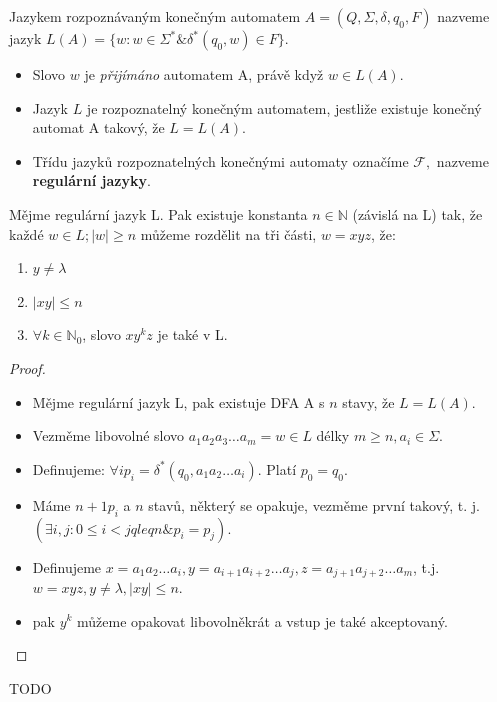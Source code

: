\documentclass[../main.tex]{subfiles}
\begin{document}
\begin{definition}
    Jazykem rozpoznávaným konečným automatem $A = (Q, \Sigma, \delta, q_0, F)$ nazveme jazyk
    $L(A) = \{ w : w \in \Sigma^* \& \delta^* (q_0,w) \in F\}$.

    \begin{itemize}
        \item Slovo $w$ je \textit{přijímáno} automatem A, právě když $w \in L(A)$.
        \item Jazyk $L$ je rozpoznatelný konečným automatem, jestliže existuje konečný automat A takový, že $L = L(A)$.
        \item Třídu jazyků rozpoznatelných konečnými automaty označíme $\mathcal{F},$ nazveme \textbf{regulární jazyky}.
    \end{itemize}
\end{definition}

\begin{theorem}
    Mějme regulární jazyk L. Pak existuje konstanta $n \in \mathbb{N}$ (závislá na L) tak, že 
    každé $w \in L; |w| \geq n$ můžeme rozdělit na tři části, $w = xyz$, že:
    \begin{enumerate}
        \item $y \neq \lambda$
        \item $|xy| \leq n$
        \item $\forall k \in \mathbb{N}_0$, slovo $xy^kz$ je také v L.
    \end{enumerate}

    \begin{proof}
        \begin{itemize}
            \item Mějme regulární jazyk L, pak existuje DFA A s $n$ stavy, že $L = L(A)$.
            \item Vezměme libovolné slovo $a_1 a_2 a_3 \dots a_m = w \in L$ délky $m \geq n, a_i \in \Sigma$.
            \item Definujeme: $\forall i p_i = \delta^* (q_0,a_1 a_2 \dots a_i).$ Platí $p_0 = q_0$.
            \item Máme $n+1 p_i$ a $n$ stavů, některý se opakuje, vezměme první takový, t. j. $(\exists i,j : 0 \leq i < j qleq n \& p_i = p_j)$.
            \item Definujeme $x = a_1 a_2 \dots a_i, y=a_{i+1}a_{i+2}\dots a_j, z = a_{j+1}a_{j+2}\dots a_{m}$, t.j.
            $w = xyz, y \neq \lambda, |xy| \leq n$.
            \item pak $y^k$ můžeme opakovat libovolněkrát a vstup je také akceptovaný.
        \end{itemize}
    \end{proof}

\end{theorem}
\begin{example}
    TODO
\end{example}
\end{document}
